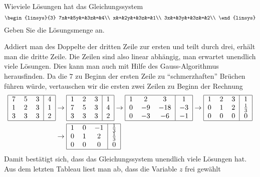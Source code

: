 Wieviele Lösungen hat das Gleichungssystem
\[
\begin{linsys}{3}
7x&+&5y&+&3z&=&4\\
x&+&2y&+&3z&=&1\\
3x&+&3y&+&3z&=&2\\
\end{linsys}
\]
Geben Sie die Lösungsmenge an.

\begin{loesung}
Addiert man des Doppelte der dritten Zeile zur ersten und teilt
durch drei, erhält man die dritte Zeile. Die Zeilen sind also
linear abhängig, man erwartet
unendlich viele Lösungen. Dies kann man auch mit Hilfe des
Gauss-Algorithmus herausfinden. Da die $7$ zu Beginn der ersten
Zeile zu ``schmerzhaften'' Brüchen führen würde, vertauschen
wir die ersten zwei Zeilen zu Beginn der Rechnung
\begin{align*}
\begin{tabular}{|ccc|c|}
\hline
7&5&3&4\\
1&2&3&1\\
3&3&3&2\\
\hline
\end{tabular}
&\rightarrow
\begin{tabular}{|ccc|c|}
\hline
1&2&3&1\\
7&5&3&4\\
3&3&3&2\\
\hline
\end{tabular}
\rightarrow
\begin{tabular}{|ccc|c|}
\hline
1&2&3&1\\
0&$-9$&$-18$&$-3$\\
0&$-3$&$-6$&$-1$\\
\hline
\end{tabular}
\rightarrow
\begin{tabular}{|ccc|c|}
\hline
1&2&3&1\\
0&1&2&$\frac13$\\
0&0&0&0\\
\hline
\end{tabular}
\\
&\rightarrow
\begin{tabular}{|ccc|c|}
\hline
1&0&$-1$&$\frac13$\\
0&1&2&$\frac13$\\
0&0&0&0\\
\hline
\end{tabular}
\end{align*}
Damit bestätigt sich, dass das Gleichungssystem unendlich viele Lösungen
hat.
Aus dem letzten Tableau liest man ab, dass die Variable $z$ frei gewählt

\end{loesung}
